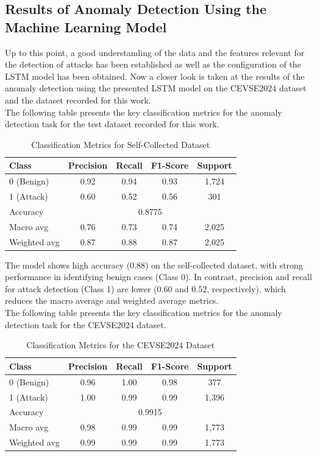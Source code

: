 \subsection{Results of Anomaly Detection Using the Machine Learning Model}

Up to this point, a good understanding of the data and the features relevant for the detection of attacks has been established as well as the configuration of the LSTM model has been obtained. Now a closer look is taken at the results of the anomaly detection using the presented LSTM model on the CEVSE2024 dataset and the dataset recorded for this work.\\

The following table presents the key classification metrics for the anomaly detection task for the test dataset recorded for this work.
\begin{table}[h]
\centering
\caption{Classification Metrics for Self-Collected Dataset}
\begin{tabular}{lcccc}
\hline
Class & Precision & Recall & F1-Score & Support \\
\hline
0 (Benign)      & 0.92 & 0.94 & 0.93 & 1,724 \\
1 (Attack)      & 0.60 & 0.52 & 0.56 &   301 \\
\hline
Accuracy        & \multicolumn{4}{c}{0.8775} \\
Macro avg       & 0.76 & 0.73 & 0.74 & 2,025 \\
Weighted avg    & 0.87 & 0.88 & 0.87 & 2,025 \\
\hline
\end{tabular}
\end{table}

The model shows high accuracy (0.88) on the self-collected dataset, with strong performance in identifying benign cases (Class 0). In contrast, precision and recall for attack detection (Class 1) are lower (0.60 and 0.52, respectively), which reduces the macro average and weighted average metrics.\\

The following table presents the key classification metrics for the anomaly detection task for the CEVSE2024 dataset.
\begin{table}[h]
\centering
\caption{Classification Metrics for the CEVSE2024 Dataset}
\begin{tabular}{lcccc}
\hline
Class & Precision & Recall & F1-Score & Support \\
\hline
0 (Benign)      & 0.96 & 1.00 & 0.98 &   377 \\
1 (Attack)      & 1.00 & 0.99 & 0.99 & 1,396 \\
\hline
Accuracy        & \multicolumn{4}{c}{0.9915} \\
Macro avg       & 0.98 & 0.99 & 0.99 & 1,773 \\
Weighted avg    & 0.99 & 0.99 & 0.99 & 1,773 \\
\hline
\end{tabular}
\end{table}


